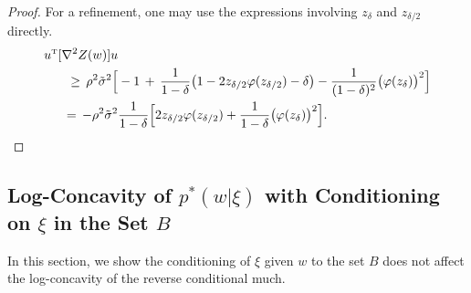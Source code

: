 \documentclass{article}
\numberwithin{equation}{section}
\theoremstyle{Lemma}
\theoremstyle{Corollary}
\theoremstyle{Theorem}
\theoremstyle{Remark}
\begin{document}
\begin{proof}
For a refinement, one may use the expressions involving $z_\delta$ and $z_{\delta/2}$ directly.
\begin{align}
     u^{\text{\tiny{T}}}[\nabla^{2} Z(w)]u&\\
\geq\,
\rho^{2}\tilde{\sigma}^{2}\Big[&-1\,+\,\frac{1}{1-\delta}\big(1- 2z_{\delta/2}\varphi(z_{\delta/2})-\delta \big)-\frac{1}{(1-\delta)^2}\big(\varphi(z_\delta)\big)^2\Big]\\
= \,
- \rho^{2}\tilde{\sigma}^2 &\frac{1}{1-\delta} \Big[2z_{\delta/2}\varphi(z_{\delta/2})+\frac{1}{1-\delta}\big(\varphi(z_\delta)\big)^2\Big].
\end{align}
\end{proof}

\subsection{\textbf{Log-Concavity of $p^{*}(w|\xi)$ with Conditioning on $\xi$ in the Set $B$}}\label{app_rev_logcon}
In this section, we show the conditioning of $\xi$ given $w$ to the set $B$ does not affect the log-concavity of the reverse conditional much.
\end{document}
